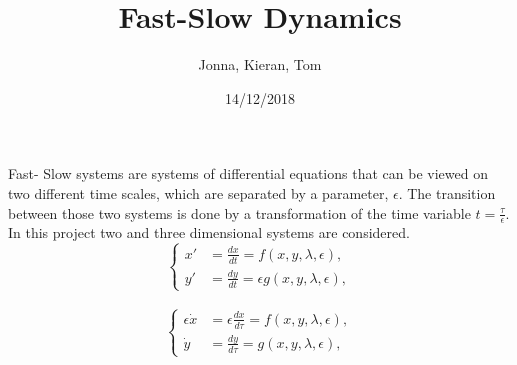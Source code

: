 \documentclass[15pt, a0paper, portrait]{tikzposter}
\title{Fast-Slow Dynamics}
\author{Jonna, Kieran, Tom }
\date{14/12/2018}
\begin{document}
 
\maketitle
 
\block{~}
{

Fast- Slow systems are systems of differential equations that can be viewed on two different time scales, which are separated by a parameter, $\epsilon$. The transition between those two systems is done by a transformation of the time variable $t = \frac{\tau}{\epsilon}$. 
In this project two and three dimensional systems are considered.
\\

\begin{equation*} 
\begin{cases}
x' &=\frac{dx}{dt}= f(x,y,\lambda, \epsilon),\\
y' &= \frac{dy}{dt}= \epsilon g( x,y, \lambda, \epsilon),
\end{cases}\label{FastS}
\end{equation*}

\begin{align*}
\begin{cases}
\epsilon \dot{x} &= \epsilon \frac{dx}{d \tau} = f(x,y,\lambda, \epsilon),\\
\dot{y} & = \frac{dy}{d \tau} =  g( x,y, \lambda, \epsilon),
\end{cases}\label{SlowS}
\end{align*}
}
 
\end{document}
